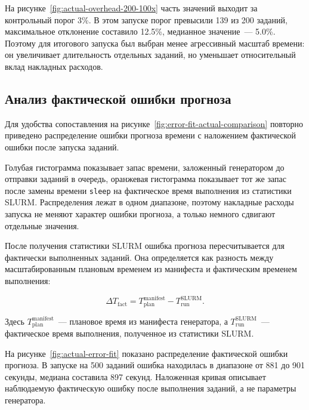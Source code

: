 
На рисунке~\ref{fig:actual-overhead-200-100x} часть значений выходит за контрольный порог 3\%. В этом запуске порог превысили 139 из 200 заданий, максимальное отклонение составило 12.5\%, медианное значение~--- 5.0\%. Поэтому для итогового запуска был выбран менее агрессивный масштаб времени: он увеличивает длительность отдельных заданий, но уменьшает относительный вклад накладных расходов.

\subsection{Анализ фактической ошибки прогноза}\label{sec:actual-forecast-error}

Для удобства сопоставления на рисунке~\ref{fig:error-fit-actual-comparison} повторно приведено распределение ошибки прогноза времени с наложением фактической ошибки после запуска заданий.


Голубая гистограмма показывает запас времени, заложенный генератором до отправки заданий в очередь, оранжевая гистограмма показывает тот же запас после замены времени \texttt{sleep} на фактическое время выполнения из статистики SLURM. Распределения лежат в одном диапазоне, поэтому накладные расходы запуска не меняют характер ошибки прогноза, а только немного сдвигают отдельные значения.

После получения статистики SLURM ошибка прогноза пересчитывается для фактически выполненных заданий. Она определяется как разность между масштабированным плановым временем из манифеста и фактическим временем выполнения:

\[
    \Delta T_{\text{fact}} =
    T_{\text{plan}}^{\text{manifest}} -
    T_{\text{run}}^{\text{SLURM}}.
\]

Здесь $T_{\text{plan}}^{\text{manifest}}$~--- плановое время из манифеста генератора, а $T_{\text{run}}^{\text{SLURM}}$~--- фактическое время выполнения, полученное из статистики SLURM.

На рисунке~\ref{fig:actual-error-fit} показано распределение фактической ошибки прогноза. В запуске на 500 заданий ошибка находилась в диапазоне от 881 до 901 секунды, медиана составила 897 секунд. Наложенная кривая описывает наблюдаемую фактическую ошибку после выполнения заданий, а не параметры генератора.

